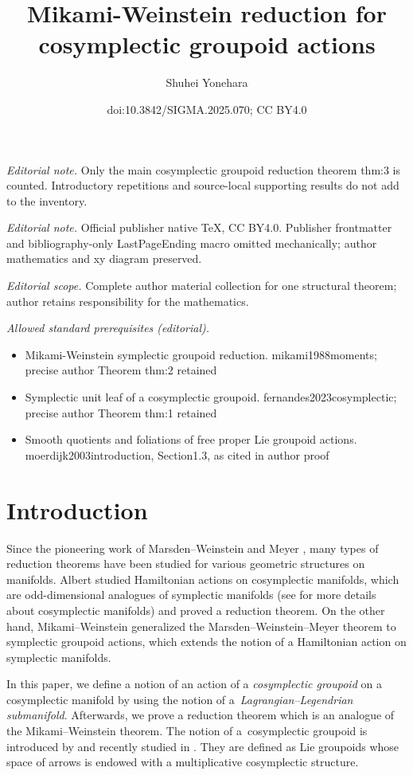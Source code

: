 \documentclass[10pt,a4paper]{amsart}
\title{Mikami-Weinstein reduction for cosymplectic groupoid actions}
\author{Shuhei Yonehara}
\date{doi:10.3842/SIGMA.2025.070; CC BY4.0}
\numberwithin{equation}{section}
\begin{document}
\maketitle
\noindent\textit{Editorial note.} Only the main cosymplectic groupoid reduction theorem thm:3 is counted. Introductory repetitions and source-local supporting results do not add to the inventory.\par\medskip
\noindent\textit{Editorial note.} Official publisher native TeX, CC BY4.0. Publisher frontmatter and bibliography-only LastPageEnding macro omitted mechanically; author mathematics and xy diagram preserved.\par\medskip
\noindent\textit{Editorial scope.} Complete author material collection for one structural theorem; author retains responsibility for the mathematics.\par\medskip
\noindent\textit{Allowed standard prerequisites (editorial).}\begin{itemize}
\item Mikami-Weinstein symplectic groupoid reduction. mikami1988moments; precise author Theorem thm:2 retained
\item Symplectic unit leaf of a cosymplectic groupoid. fernandes2023cosymplectic; precise author Theorem thm:1 retained
\item Smooth quotients and foliations of free proper Lie groupoid actions. moerdijk2003introduction, Section1.3, as cited in author proof
\end{itemize}\medskip
\section{Introduction}
Since the pioneering work of Marsden--Weinstein and Meyer \cite{marsden1974reduction,meyer1973symmetries}, many types of reduction theorems have been studied for various geometric structures on manifolds. Albert \cite{albert1989theoreme} studied Hamiltonian actions on cosymplectic manifolds, which are odd-dimensional analogues of symplectic manifolds (see \cite{cappelletti2013survey} for more details about cosymplectic manifolds) and proved a reduction theorem. On the other hand, Mikami--Weinstein \cite{mikami1988moments} generalized the Marsden--Weinstein--Meyer theorem to symplectic groupoid actions, which extends the notion of a Hamiltonian action on symplectic manifolds.


In this paper, we define a notion of an action of a \textit{cosymplectic groupoid} on a cosymplectic manifold by using the notion of a~\textit{Lagrangian--Legendrian submanifold}. Afterwards, we prove a reduction theorem which is an analogue of the Mikami--Weinstein theorem. The notion of a~cosymplectic groupoid is introduced by \cite{djiba2015cosymplectic} and recently studied in \cite{fernandes2023cosymplectic}. They are defined as Lie groupoids whose space of arrows is endowed with a multiplicative cosymplectic structure.
\end{document}

